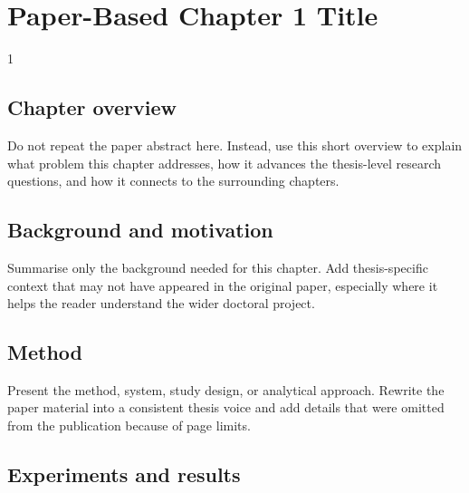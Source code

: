 \doublespacing %

\chapter{Paper-Based Chapter 1 Title}
\label{ch:paper1}

\begin{spacing}{1} %
\minitoc %
\end{spacing} %
\thesisspacing %


\section{Chapter overview}

Do not repeat the paper abstract here. Instead, use this short overview to explain what problem this chapter addresses, how it advances the thesis-level research questions, and how it connects to the surrounding chapters.

\section{Background and motivation}

Summarise only the background needed for this chapter. Add thesis-specific context that may not have appeared in the original paper, especially where it helps the reader understand the wider doctoral project.

\section{Method}

Present the method, system, study design, or analytical approach. Rewrite the paper material into a consistent thesis voice and add details that were omitted from the publication because of page limits.

\section{Experiments and results}

